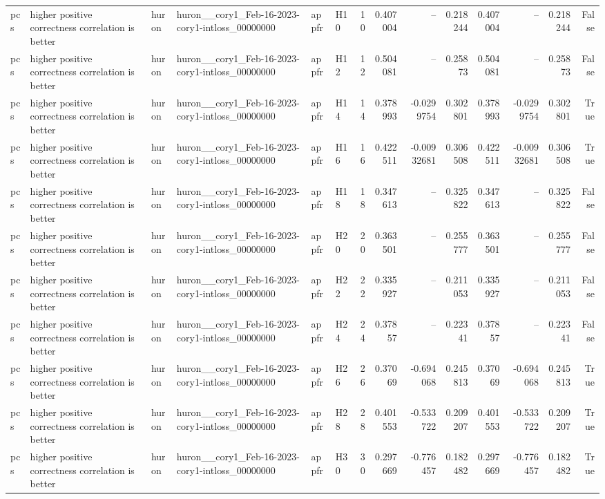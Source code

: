 \begin{longtable}{llllllrrrrrrrr}
pcs & higher positive correctness correlation is better & huron & huron\_\_cory1\_Feb-16-2023-cory1-intloss\_00000000 & appfr & H10 & 10 & 0.407004 & -- & 0.218244 & 0.407004 & -- & 0.218244 & False \\
pcs & higher positive correctness correlation is better & huron & huron\_\_cory1\_Feb-16-2023-cory1-intloss\_00000000 & appfr & H12 & 12 & 0.504081 & -- & 0.25873 & 0.504081 & -- & 0.25873 & False \\
pcs & higher positive correctness correlation is better & huron & huron\_\_cory1\_Feb-16-2023-cory1-intloss\_00000000 & appfr & H14 & 14 & 0.378993 & -0.0299754 & 0.302801 & 0.378993 & -0.0299754 & 0.302801 & True \\
pcs & higher positive correctness correlation is better & huron & huron\_\_cory1\_Feb-16-2023-cory1-intloss\_00000000 & appfr & H16 & 16 & 0.422511 & -0.00932681 & 0.306508 & 0.422511 & -0.00932681 & 0.306508 & True \\
pcs & higher positive correctness correlation is better & huron & huron\_\_cory1\_Feb-16-2023-cory1-intloss\_00000000 & appfr & H18 & 18 & 0.347613 & -- & 0.325822 & 0.347613 & -- & 0.325822 & False \\
pcs & higher positive correctness correlation is better & huron & huron\_\_cory1\_Feb-16-2023-cory1-intloss\_00000000 & appfr & H20 & 20 & 0.363501 & -- & 0.255777 & 0.363501 & -- & 0.255777 & False \\
pcs & higher positive correctness correlation is better & huron & huron\_\_cory1\_Feb-16-2023-cory1-intloss\_00000000 & appfr & H22 & 22 & 0.335927 & -- & 0.211053 & 0.335927 & -- & 0.211053 & False \\
pcs & higher positive correctness correlation is better & huron & huron\_\_cory1\_Feb-16-2023-cory1-intloss\_00000000 & appfr & H24 & 24 & 0.37857 & -- & 0.22341 & 0.37857 & -- & 0.22341 & False \\
pcs & higher positive correctness correlation is better & huron & huron\_\_cory1\_Feb-16-2023-cory1-intloss\_00000000 & appfr & H26 & 26 & 0.37069 & -0.694068 & 0.245813 & 0.37069 & -0.694068 & 0.245813 & True \\
pcs & higher positive correctness correlation is better & huron & huron\_\_cory1\_Feb-16-2023-cory1-intloss\_00000000 & appfr & H28 & 28 & 0.401553 & -0.533722 & 0.209207 & 0.401553 & -0.533722 & 0.209207 & True \\
pcs & higher positive correctness correlation is better & huron & huron\_\_cory1\_Feb-16-2023-cory1-intloss\_00000000 & appfr & H30 & 30 & 0.297669 & -0.776457 & 0.182482 & 0.297669 & -0.776457 & 0.182482 & True \\

\end{longtable}
